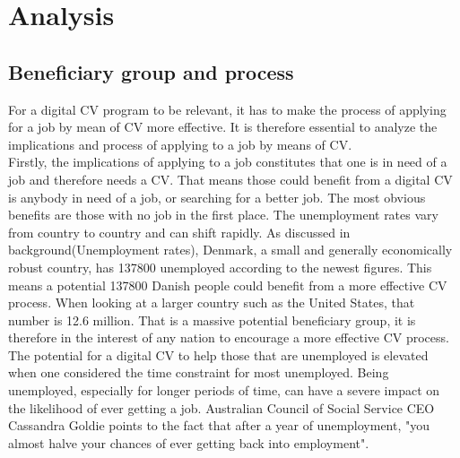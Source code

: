 \section{Analysis}\label{sec:analysis}

\subsection{Beneficiary group and process}
For a digital CV program to be relevant, it has to make the process of applying for a job by mean of CV more effective.  
It is therefore essential to analyze the implications and process of applying to a job by means of CV. \\

Firstly, the implications of applying to a job constitutes that one is in need of a job and therefore needs a CV.
That means those could benefit from a digital CV is anybody in need of a job, or searching for a better job. 
The most obvious benefits are those with no job in the first place. 
The unemployment rates vary from country to country and can shift rapidly.
As discussed in background(Unemployment rates), Denmark, a small and generally economically robust country, has 137800 unemployed according to the newest figures. 
This means a potential 137800 Danish people could benefit from a more effective CV process. 
When looking at a larger country such as the United States, that number is 12.6 million.
That is a massive potential beneficiary group, it is therefore in the interest of any nation to encourage a more effective CV process.
The potential for a digital CV to help those that are unemployed is elevated when one considered the time constraint for most unemployed.
Being unemployed, especially for longer periods of time, can have a severe impact on the likelihood of ever getting a job.
Australian Council of Social Service CEO Cassandra Goldie points to the fact that after a year of unemployment, "you almost halve your chances of ever getting back into employment". \\

